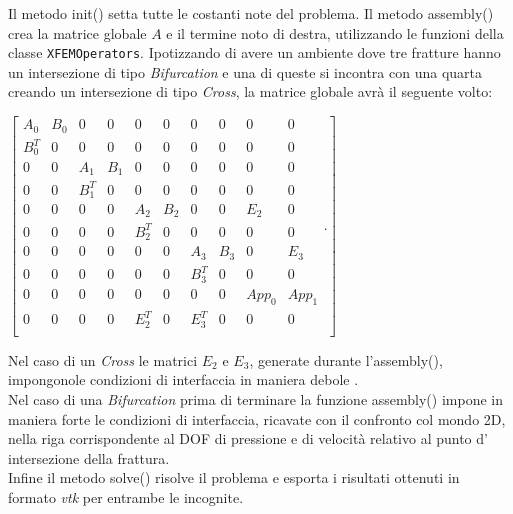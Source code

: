 Il metodo init() setta tutte le costanti note del problema.
Il metodo assembly() crea la matrice globale $A$ e il termine noto di destra, utilizzando le funzioni della classe \texttt{XFEMOperators}. 
Ipotizzando di avere un ambiente dove tre fratture hanno un intersezione di tipo \textit{Bifurcation} e una di queste si incontra con una quarta creando un intersezione di tipo \textit{Cross}, la matrice globale avrà il seguente volto:\\
 \begin{center}
  $ \left[ \begin{matrix}
 			A_{0} &  B_{0} & 0 & 0 & 0 & 0 & 0 & 0 & 0 & 0\\ 
 			B_{0}^{T} & 0 & 0 & 0 & 0 & 0 & 0 & 0 & 0 & 0\\
 			0 & 0 & A_{1} &  B_{1} & 0 & 0 & 0 & 0 & 0 & 0 \\ 
		 	0 & 0 & B_{1}^{T} & 0 & 0 & 0 & 0 & 0 & 0 & 0 \\
		 	0 & 0 & 0 & 0 & A_{2} &  B_{2} & 0 & 0 & E_{2} & 0\\ 
		 	0 & 0 & 0 & 0 & B_{2}^{T} & 0 & 0 & 0 & 0 & 0\\
		 	0 & 0 & 0 & 0 & 0 & 0 & A_{3} &  B_{3} & 0 & E_{3} \\ 
 			0 & 0 & 0 & 0 & 0 & 0 & B_{3}^{T} & 0 & 0 & 0\\
 			0 & 0 & 0 & 0 & 0 & 0 & 0 & 0 & App_{0} & App_{1} \\
 			0 & 0 & 0 & 0 & E_{2}^{T} & 0 & E_{3}^{T} & 0 & 0 & 0\\
 			\end{matrix}.\right] $ 
  \end{center}
Nel caso di un \textit{Cross} le matrici $E_{2}$ e $E_{3}$, generate durante l'assembly(), impongonole condizioni di interfaccia in maniera debole .\\
Nel caso di una \textit{Bifurcation} prima di terminare la funzione assembly() impone in maniera forte le condizioni di interfaccia, ricavate con il confronto col mondo 2D, nella riga corrispondente al DOF di pressione e di velocit\`{a} relativo al punto d' intersezione della frattura.\\
Infine il metodo solve() risolve il problema e esporta i risultati ottenuti in formato \emph{vtk} per entrambe le incognite.\\

